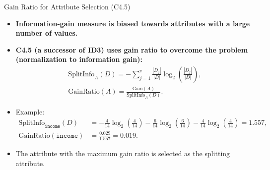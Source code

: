 \begin{frame}{Gain Ratio for Attribute Selection (C4.5)}
  \begin{itemize}
  \item \textbf{Information-gain measure is biased towards attributes with a large number of values.}
  \item \textbf{C4.5 (a successor of ID3) uses gain ratio to overcome the problem (normalization to information gain):}
    \begin{align}
      \text{SplitInfo}_A(D) = - \sum_{j=1}^{v} \frac{|D_j|}{|D|} \log_2\left( \frac{|D_j|}{|D|} \right),\\
      \text{GainRatio}(A) = \frac{\text{Gain}(A)}{\text{SplitInfo}_A(D)}.
    \end{align}
  \item Example:
    \begin{align}
      \text{SplitInfo}_{\texttt{income}}(D) &= -\frac{4}{14} \log_2 \left( \frac{4}{14} \right) - \frac{6}{14} \log_2 \left( \frac{6}{14} \right) - \frac{4}{14} \log_2 \left( \frac{4}{14} \right) = 1.557,\\
      \text{GainRatio}(\texttt{income}) &= \frac{0.029}{1.557} = 0.019.
    \end{align}
  \item The attribute with the maximum gain ratio is selected as the splitting attribute.
  \end{itemize}
\end{frame}

